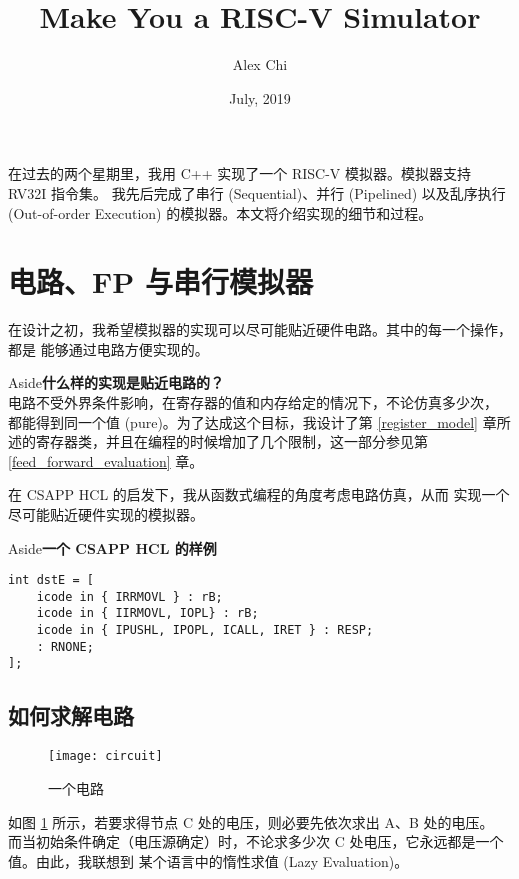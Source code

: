 \documentclass[12pt]{article}
\title{Make You a RISC-V Simulator}
\author{Alex Chi}
\date{July, 2019}
\newenvironment{aside}[1]
    { \begin{tcolorbox}[enlarge top by=0.5cm, enlarge bottom by=0.5cm] Aside\space\space\space\space \textbf{#1} \\
        } { \end{tcolorbox} }
\begin{document}
\maketitle 

    在过去的两个星期里，我用 C++ 实现了一个 RISC-V 模拟器。模拟器支持 RV32I 指令集。
    我先后完成了串行 (Sequential)、并行 (Pipelined) 以及乱序执行 (Out-of-order Execution)
    的模拟器。本文将介绍实现的细节和过程。

    \section{电路、FP 与串行模拟器}
    
    在设计之初，我希望模拟器的实现可以尽可能贴近硬件电路。其中的每一个操作，都是
    能够通过电路方便实现的。

    \begin{aside}{什么样的实现是贴近电路的？}
        电路不受外界条件影响，在寄存器的值和内存给定的情况下，不论仿真多少次，
        都能得到同一个值 (pure)。为了达成这个目标，我设计了第 \ref{register_model}
        章所述的寄存器类，并且在编程的时候增加了几个限制，这一部分参见第 
        \ref{feed_forward_evaluation} 章。
    \end{aside}

    在 CSAPP HCL 的启发下，我从函数式编程的角度考虑电路仿真，从而
    实现一个尽可能贴近硬件实现的模拟器。

    \begin{aside}{一个 CSAPP HCL 的样例}
        \begin{verbatim}
int dstE = [
    icode in { IRRMOVL } : rB; 
    icode in { IIRMOVL, IOPL} : rB; 
    icode in { IPUSHL, IPOPL, ICALL, IRET } : RESP; 
    : RNONE;
];
        \end{verbatim}
    \end{aside}

    \subsection{如何求解电路}

    \begin{figure}[h]
        \centering
        \texttt{[image: circuit]}
        \caption{一个电路}
        \label{fig:circuit}
    \end{figure}

    如图 \ref{fig:circuit} 所示，若要求得节点 C 处的电压，则必要先依次求出 A、B 处的电压。
    而当初始条件确定（电压源确定）时，不论求多少次 C 处电压，它永远都是一个值。由此，我联想到
    某个语言中的惰性求值 (Lazy Evaluation)。
\end{document}
